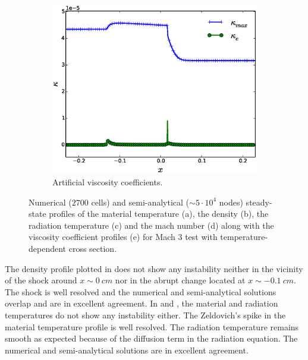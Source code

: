 \documentclass[times,doublespace]{fldauth}%
\begin{document}
\begin{figure}[h]
\begin{center}
    ~
    \begin{subfigure}{0.32\textwidth}
    \centering
    \includegraphics[width=\linewidth]{figures/dpt-xs/mass-diff-visc-nel-2700-plot.eps}
    \caption{Artificial viscosity coefficients.}\label{fig:mach-3-dpt-xs-visc}
    \end{subfigure}      
    \end{center}  
\caption{Numerical ($2700$ cells) and semi-analytical ($\sim 5 \cdot 10^4$ nodes) steady-state profiles of the material temperature (a), the density (b), the radiation temperature (c) and the mach number (d) along with the viscosity coefficient profiles (e) for Mach $3$ test with temperature-dependent cross section.}\label{fig:mach-3-temp-dep-xs}    
\end{figure}
%
The density profile plotted in  does not show any instability neither in the vicinity of the shock around $x \sim 0 \ cm$ nor in the abrupt change located at $x \sim -0.1 \ cm$. The shock is well resolved and the numerical and semi-analytical solutions overlap and are in excellent agreement.
In  and , the material and radiation temperatures do not show any instability either. The Zeldovich's spike in the material temperature profile is well resolved. The radiation temperature remains smooth as expected because of the diffusion term in the radiation equation. The numerical and semi-analytical solutions are in excellent agreement. 
\end{document}
